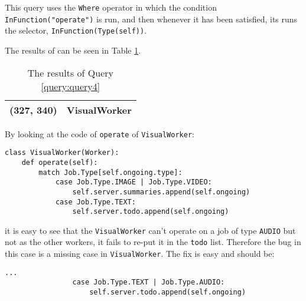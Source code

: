 \documentclass[sigconf,review]{acmart}
\begin{document}
    This query uses the \texttt{Where} operator in which the condition \texttt{InFunction("operate")} is run, and then whenever it has been satisfied, its runs the selector, \texttt{InFunction(Type(self))}.

    The results of can be seen in Table \ref{tab:q4res}.

    \begin{table}[h]
        \centering
        \begin{tabular}{|c|p{5cm}|}
            \hline
            (327, 340) & VisualWorker \\ \hline
        \end{tabular}
        \caption{The results of Query \protect\ref{query:query4}}
        \label{tab:q4res}
    \end{table}

    By looking at the code of \texttt{operate} of \texttt{VisualWorker}:

    \begin{lstlisting}[style={python_code_short}]
class VisualWorker(Worker):
    def operate(self):
        match Job.Type[self.ongoing.type]:
            case Job.Type.IMAGE | Job.Type.VIDEO:
                self.server.summaries.append(self.ongoing)
            case Job.Type.TEXT:
                self.server.todo.append(self.ongoing)
    \end{lstlisting}

    it is easy to see that the \texttt{VisualWorker} can't operate on a job of type \texttt{AUDIO} but not as the other workers, it fails to re-put it in the \texttt{todo} list.
    Therefore the bug in this case is a missing case in \texttt{VisualWorker}. The fix is easy and should be:
    \begin{lstlisting}[style={python_code_short}]
...
                case Job.Type.TEXT | Job.Type.AUDIO:
                    self.server.todo.append(self.ongoing)
    \end{lstlisting}




    
\end{document}

